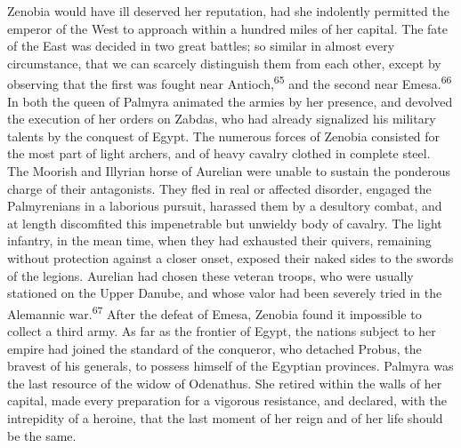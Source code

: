 Zenobia would have ill deserved her reputation, had she
indolently permitted the emperor of the West to approach within a
hundred miles of her capital. The fate of the East was decided in
two great battles; so similar in almost every circumstance, that
we can scarcely distinguish them from each other, except by
observing that the first was fought near Antioch,\textsuperscript{65} and the
second near Emesa.\textsuperscript{66} In both the queen of Palmyra animated the
armies by her presence, and devolved the execution of her orders
on Zabdas, who had already signalized his military talents by the
conquest of Egypt. The numerous forces of Zenobia consisted for
the most part of light archers, and of heavy cavalry clothed in
complete steel. The Moorish and Illyrian horse of Aurelian were
unable to sustain the ponderous charge of their antagonists. They
fled in real or affected disorder, engaged the Palmyrenians in a
laborious pursuit, harassed them by a desultory combat, and at
length discomfited this impenetrable but unwieldy body of
cavalry. The light infantry, in the mean time, when they had
exhausted their quivers, remaining without protection against a
closer onset, exposed their naked sides to the swords of the
legions. Aurelian had chosen these veteran troops, who were
usually stationed on the Upper Danube, and whose valor had been
severely tried in the Alemannic war.\textsuperscript{67} After the defeat of
Emesa, Zenobia found it impossible to collect a third army. As
far as the frontier of Egypt, the nations subject to her empire
had joined the standard of the conqueror, who detached Probus,
the bravest of his generals, to possess himself of the Egyptian
provinces. Palmyra was the last resource of the widow of
Odenathus. She retired within the walls of her capital, made
every preparation for a vigorous resistance, and declared, with
the intrepidity of a heroine, that the last moment of her reign
and of her life should be the same.




